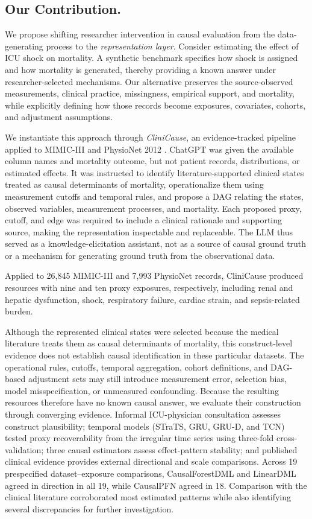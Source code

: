 \documentclass[letterpaper]{article}
\begin{document}
\subsection*{Our Contribution.}
We propose shifting researcher intervention in causal evaluation from the
data-generating process to the \emph{representation layer}. Consider estimating
the effect of ICU shock on mortality. A synthetic benchmark specifies how shock
is assigned and how mortality is generated, thereby providing a known answer
under researcher-selected mechanisms. Our alternative preserves the
source-observed measurements, clinical practice, missingness, empirical
support, and mortality, while explicitly defining how those records become
exposures, covariates, cohorts, and adjustment assumptions.

We instantiate this approach through \emph{CliniCause}, an evidence-tracked
pipeline applied to MIMIC-III and PhysioNet 2012
\cite{johnson2016mimiciii,silva2012physionet}. ChatGPT was given the available
column names and mortality outcome, but not patient records, distributions, or
estimated effects. It was instructed to identify literature-supported clinical
states treated as causal determinants of mortality, operationalize them using
measurement cutoffs and temporal rules, and propose a DAG relating the states,
observed variables, measurement processes, and mortality. Each proposed proxy,
cutoff, and edge was required to include a clinical rationale and supporting
source, making the representation inspectable and replaceable. The LLM thus served as a knowledge-elicitation assistant, not as a source of
causal ground truth or a mechanism for generating ground truth from the
observational data.

Applied to 26,845 MIMIC-III and 7,993 PhysioNet records, CliniCause produced
resources with nine and ten proxy exposures, respectively, including renal and
hepatic dysfunction, shock, respiratory failure, cardiac strain, and
sepsis-related burden. 

Although the represented clinical states were selected because the medical literature treats them as causal determinants of mortality, this construct-level evidence does not establish causal identification in these particular datasets.
The operational rules, cutoffs, temporal aggregation, cohort definitions, and
DAG-based adjustment sets may still introduce measurement error, selection
bias, model misspecification, or unmeasured confounding. Because the resulting
resources therefore have no known causal answer, we evaluate their construction
through converging evidence. Informal ICU-physician consultation assesses construct
plausibility; temporal models (STraTS, GRU, GRU-D, and TCN) tested proxy recoverability from the irregular time
series using three-fold cross-validation; three causal
estimators assess effect-pattern stability; and published clinical evidence
provides external directional and scale comparisons. Across 19 prespecified
dataset--exposure comparisons, CausalForestDML and LinearDML agreed in direction
in all 19, while CausalPFN agreed in 18. Comparison with the clinical literature corroborated most estimated patterns
while also identifying several discrepancies for further investigation. 
\end{document}
